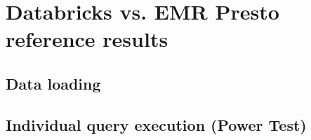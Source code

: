 \section{Databricks vs. EMR Presto reference results}\label{referenceResults}

\subsection{Data loading}\label{referenceResultsDataLoading}

\subsection{Individual query execution (Power Test)}\label{referenceResultsPowerTest}